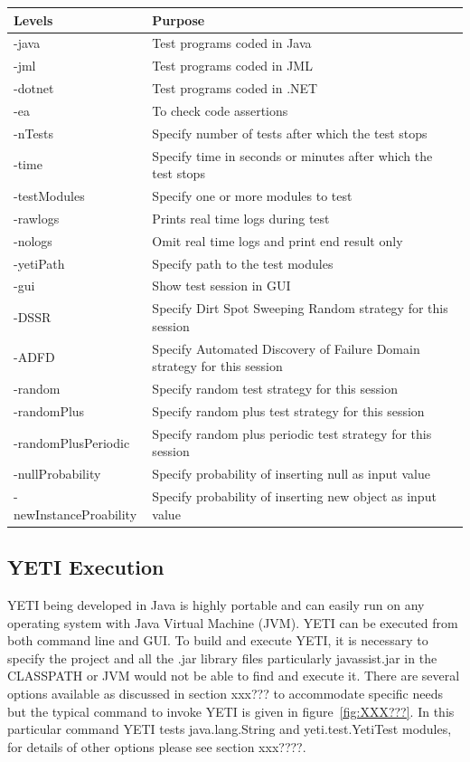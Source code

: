 \begin{enumerate}
\begin{table}[h]
\begin{tabular}{ll }
Levels 					&Purpose 			\\
\hline
-java						&Test programs coded in Java	 	\\
-jml						&Test programs coded in JML			\\
-dotnet					&Test programs coded in .NET		\\
-ea						&To check code assertions \\
-nTests					&Specify number of tests after which the test stops	\\
-time						&Specify time in seconds or minutes after which the test stops\\
-testModules				&Specify one or more modules to test 	\\
-rawlogs					&Prints real time logs during test \\
-nologs					&Omit real time logs and print end result only\\
-yetiPath					&Specify path to the test modules\\ 
-gui						&Show test session in GUI\\
-DSSR					&Specify Dirt Spot Sweeping Random strategy for this session\\
-ADFD					&Specify Automated Discovery of Failure Domain strategy for this session\\
-random					&Specify random test strategy for this session\\
-randomPlus				&Specify random plus test strategy for this session\\
-randomPlusPeriodic		&Specify random plus periodic test strategy for this session\\
-nullProbability				&Specify probability of inserting null as input value\\
-newInstanceProability		&Specify probability of inserting new object as input value\\

\hline %
\end{tabular}
\bigskip
\label{table:cliOptions} %
\end{table}


\subsection{YETI Execution}
YETI being developed in Java is highly portable and can easily run on any operating system with Java Virtual Machine (JVM). YETI can be executed from both command line and GUI. To build and execute YETI, it is necessary to specify the project and all the .jar library files particularly javassist.jar in the CLASSPATH or JVM would not be able to find and execute it. There are several options available as discussed in section xxx??? to accommodate specific needs but the typical command to invoke YETI is given in figure~\ref{fig:XXX???}. In this particular command YETI tests java.lang.String and yeti.test.YetiTest modules, for details of other options please see section xxx????. 


\end{enumerate}

